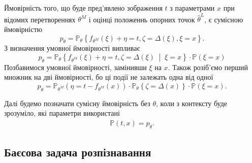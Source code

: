 Ймовірність того,
що буде пред'явлено зображення $t$ з параметрами $x$
при відомих перетвореннях $\theta^M$
і оцінці положеннь опорних точок $\hat{\theta}^L$, є сумісною ймовірністю
\begin{equation*}
  p_{\theta}
  = \mathbb{P}_{\theta}\left\{
    f_{\theta^M}\left( \xi \right) + \eta = t,
    \zeta = \Delta\left( \xi \right),
    \xi = x
  \right\}.
\end{equation*}
З визначення умовної ймовірності випливає
\begin{equation*}
  p_{\theta}
  = \mathbb{P}_{\theta}\left\{
      f_{\theta^M}\left( \xi \right) + \eta = t,
      \zeta = \Delta\left( \xi \right)
      \;\middle|\; \xi = x \right\}
    \cdot \mathbb{P}\left( \xi = x \right)
\end{equation*}
Позбавимося умовної ймовірності, замінивши $\xi$ на $x$.
Також розіб'ємо перший множник на дві ймовірності,
бо ці події не залежать одна від одної
\begin{equation*}
  p_{\theta}
  = \mathbb{P}_{\theta^M}\left( \eta = t - f_{\theta^M}\left( x \right) \right)
    \cdot \mathbb{P}_{\theta}\left\{
      \zeta = \Delta\left( x \right)
    \right\}
    \cdot \mathbb{P}\left( \xi = x \right).
\end{equation*}

Далі будемо позначати сумісну ймовірність без $\theta$,
коли з контексту буде зрозуміло,
які параметри використані
\begin{align*}
  \mathbb{P}\left( t, x \right) = p_{\theta}.
\end{align*}

\subsection{Баєсова задача розпізнавання}

